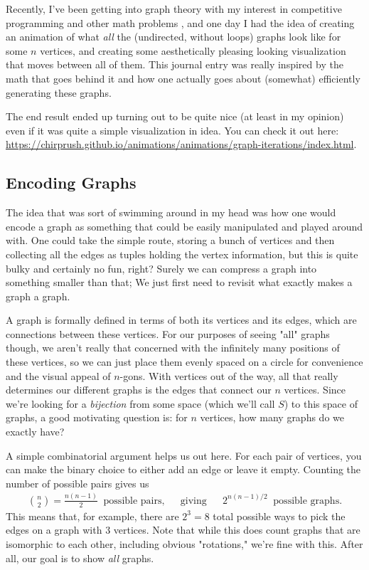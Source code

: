 Recently, I've been getting into graph theory with my interest in competitive
programming and other math problems , and one day I had the idea of creating an animation of
what \textit{all} the (undirected, without loops) graphs look like for some \(
n \) vertices, and creating some aesthetically pleasing looking visualization
that moves between all of them. This journal entry was really inspired by the
math that goes behind it and how one actually goes about (somewhat) efficiently
generating these graphs.

The end result ended up turning out to be quite nice (at least in my opinion)
even if it was quite a simple visualization in idea. You can check it out here:
\url{https://chirprush.github.io/animations/animations/graph-iterations/index.html}.

\subsection{Encoding Graphs}

The idea that was sort of swimming around in my head was how one would encode a
graph as something that could be easily manipulated and played around with. One
could take the simple route, storing a bunch of vertices and then collecting
all the edges as tuples holding the vertex information, but this is quite bulky
and certainly no fun, right? Surely we can compress a graph into something
smaller than that; We just first need to revisit what exactly makes a graph a
graph.

A graph is formally defined in terms of both its vertices and its edges, which
are connections between these vertices. For our purposes of seeing "all" graphs
though, we aren't really that concerned with the infinitely many positions of
these vertices, so we can just place them evenly spaced on a circle for
convenience and the visual appeal of \( n \)-gons. With vertices out of the
way, all that really determines our different graphs is the edges that connect
our \( n \) vertices. Since we're looking for a \textit{bijection} from some
space (which we'll call \( S \)) to this space of graphs, a good motivating
question is: for \( n \) vertices, how many graphs do we exactly have?

A simple combinatorial argument helps us out here. For each pair of vertices,
you can make the binary choice to either add an edge or leave it empty. Counting the number of possible pairs gives us
\begin{align*}
    \binom{n}{2} = \frac{n \left( n - 1 \right)}{2} \> \text{ possible pairs,} && \text{giving} && 2^{n \left( n - 1 \right) / 2} \> \text{ possible graphs}
.\end{align*}
This means that, for example, there are \( 2^3 = 8 \) total possible ways to
pick the edges on a graph with \( 3 \) vertices. Note that while this does
count graphs that are isomorphic to each other, including obvious "rotations," we're fine with this. After all, our goal is to show \textit{all} graphs.


